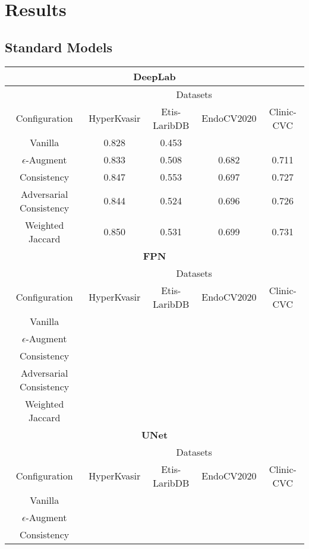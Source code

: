     \chapter{Results}
    \section{Standard Models}
    \begin{center}
        \begin{tabular}{|c|c|c|c|c|}
        \hline
        \multicolumn{5}{|c|}{\textbf{DeepLab}}\\
        \hline
        &\multicolumn{4}{|c|}{Datasets}\\
        \cline{2-5}
        Configuration&HyperKvasir&Etis-LaribDB&EndoCV2020 & Clinic-CVC \\
        \hline
        Vanilla& 0.828 & 0.453 & &\\
        \hline
        \(\epsilon\)-Augment& 0.833 & 0.508 & 0.682 & 0.711 \\
        Consistency & 0.847 & 0.553 & 0.697 & 0.727 \\
        Adversarial Consistency & 0.844&0.524&0.696&0.726 \\
        Weighted Jaccard&0.850&0.531&0.699&0.731\\
        \hline
        \multicolumn{5}{|c|}{\textbf{FPN}}\\
        \hline
        &\multicolumn{4}{|c|}{Datasets}\\
        \cline{2-5}
        Configuration&HyperKvasir&Etis-LaribDB&EndoCV2020 & Clinic-CVC \\
        \hline
        Vanilla&  &  & &\\
        \hline
        \(\epsilon\)-Augment& & & & \\
        Consistency & & && \\
        Adversarial Consistency&&&& \\
        Weighted Jaccard&&&&\\
        \hline
        \multicolumn{5}{|c|}{\textbf{UNet}}\\
        \hline
        &\multicolumn{4}{|c|}{Datasets}\\
        \cline{2-5}
        Configuration&HyperKvasir&Etis-LaribDB&EndoCV2020 & Clinic-CVC \\
        \hline
        Vanilla&  &  & &\\
        \(\epsilon\)-Augment& & & & \\
        Consistency & & && \\

\end{tabular}
\end{center}
